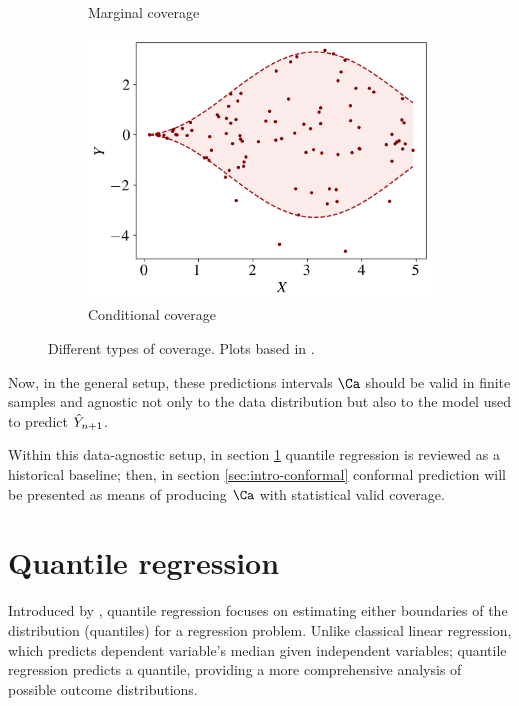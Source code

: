 \begin{figure}[ht]
\begin{subfigure}[b]{0.3\textwidth}
        \caption{Marginal coverage}
        \label{fig:coverage:marg-cover}
    \end{subfigure}
    \hfill
    \begin{subfigure}[b]{0.3\textwidth}
        \centering
        \includegraphics[width=\textwidth]{Figures/coverage/conditional-coverage.png}
        \caption{Conditional coverage}
        \label{fig:coverage:cond-cover}
    \end{subfigure}
    \caption{Different types of coverage. Plots based in \cite{cptuto}.}
    \label{fig:coverage}
\end{figure}

Now, in the general setup, these predictions intervals $\Ca$ should be valid in finite samples and agnostic not only to the data distribution but also to the model used to predict $\Hat{Y}_{n+1}$. 

Within this data-agnostic setup, in section \ref{sec:intro-quantile} quantile regression is reviewed as a historical baseline; then, in section \ref{sec:intro-conformal} conformal prediction will be presented as means of producing $\Ca$ with statistical valid coverage.

\section{Quantile regression}\label{sec:intro-quantile}

Introduced by \cite{koenker}, quantile regression focuses on estimating either boundaries of the distribution (quantiles) for a regression problem. Unlike classical linear regression, which predicts dependent variable's median given independent variables; quantile regression predicts a quantile, providing a more comprehensive analysis of possible outcome distributions.\\

